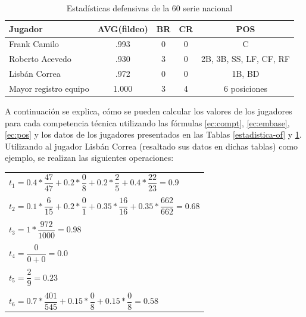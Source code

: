 \begin{table}[H]
		\centering
	\caption{Estadísticas defensivas de la 60 serie nacional}\label{estadistica-def}
		\begin{tabular}{l c c c c}
			\toprule[1.7pt]
			Jugador      &     AVG(fildeo) & BR & CR & POS                    \\ \midrule
			Frank Camilo  &   .993        & 0  & 0  & C                      \\
			Roberto Acevedo&  .930        & 3  & 0  & 2B, 3B, SS, LF, CF, RF \\
			\rowcolor{gray!30} Lisbán Correa   & .972        & 0  & 0  & 1B, BD \\ \midrule
			
			\multicolumn{1}{p{4cm}}{Mayor registro equipo}& 1.000 & 3&4 & 6 posiciones\\ 
			\bottomrule[1pt]
		\end{tabular}
	
\end{table}

A continuación se explica, cómo se pueden calcular los valores de los jugadores para cada competencia técnica utilizando las fórmulas \ref{ec:compt}, \ref{ec:embase}, \ref{ec:pos} y los datos de los jugadores presentados en las Tablas \ref{estadistica-of} y \ref{estadistica-def}. Utilizando al jugador Lisbán Correa (resaltado sus datos en dichas tablas) como ejemplo, se realizan las siguientes operaciones:

\begin{tabular}{l}
	\\
	$t_1 = 0.4 * \dfrac{47}{47} + 0.2 * \dfrac{0}{8} + 0.2 * \dfrac{2}{5} + 0.4 * \dfrac{22}{23} = 0.9$ \\ 
	\\
	$t_2 = 0.1 * \dfrac{6}{15} + 0.2 * \dfrac{0}{1} + 0.35 * \dfrac{16}{16} + 0.35 * \dfrac{662}{662} = 0.68$ \\
	\\
	$t_3 = 1 * \dfrac{972}{1000} = 0.98$ \\
	\\
	$t_4 = \dfrac{0}{0+0} = 0.0$ \\
	\\
	$t_5 = \dfrac{2}{9} = 0.23$ \\
	\\
	$t_6 = 0.7 * \dfrac{401}{545} + 0.15 * \dfrac{0}{8} + 0.15 * \dfrac{0}{8} = 0.58$
\end{tabular}

